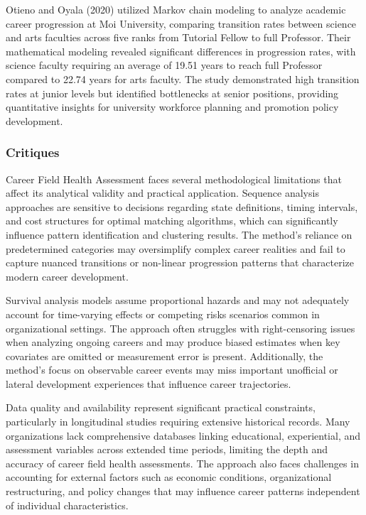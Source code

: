 \documentclass[main.tex]{subfiles}
\begin{document}
Otieno and Oyala (2020) utilized Markov chain modeling to analyze academic career progression at Moi University, comparing transition rates between science and arts faculties across five ranks from Tutorial Fellow to full Professor. Their mathematical modeling revealed significant differences in progression rates, with science faculty requiring an average of 19.51 years to reach full Professor compared to 22.74 years for arts faculty. The study demonstrated high transition rates at junior levels but identified bottlenecks at senior positions, providing quantitative insights for university workforce planning and promotion policy development\parencite{otieno2020}.

\subsubsection{Critiques}

Career Field Health Assessment faces several methodological limitations that affect its analytical validity and practical application. Sequence analysis approaches are sensitive to decisions regarding state definitions, timing intervals, and cost structures for optimal matching algorithms, which can significantly influence pattern identification and clustering results. The method's reliance on predetermined categories may oversimplify complex career realities and fail to capture nuanced transitions or non-linear progression patterns that characterize modern career development.

Survival analysis models assume proportional hazards and may not adequately account for time-varying effects or competing risks scenarios common in organizational settings. The approach often struggles with right-censoring issues when analyzing ongoing careers and may produce biased estimates when key covariates are omitted or measurement error is present\parencite{hoglin2004}. Additionally, the method's focus on observable career events may miss important unofficial or lateral development experiences that influence career trajectories.

Data quality and availability represent significant practical constraints, particularly in longitudinal studies requiring extensive historical records. Many organizations lack comprehensive databases linking educational, experiential, and assessment variables across extended time periods, limiting the depth and accuracy of career field health assessments. The approach also faces challenges in accounting for external factors such as economic conditions, organizational restructuring, and policy changes that may influence career patterns independent of individual characteristics\parencite{joseph2012}.
\end{document}

